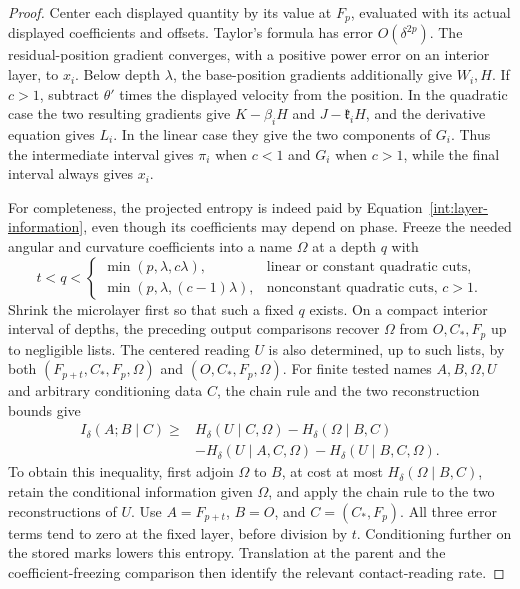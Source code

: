 \begin{proof}
Center each displayed quantity by its value at $F_p$, evaluated
with its actual displayed coefficients and offsets. Taylor's
formula has error $O(\delta^{2p})$. The residual-position
gradient converges, with a positive power error on an interior
layer, to $x_i$. Below depth $\lambda$, the base-position
gradients additionally give $W_i,H$. If $c>1$, subtract
$\theta'$ times the displayed velocity from the position.
In the quadratic case the two resulting gradients give
$K-\beta_iH$ and $J-\mathfrak k_iH$, and the derivative equation
gives $L_i$. In the linear case they give the two components
of $G_i$. Thus the intermediate interval gives $\pi_i$ when
$c<1$ and $G_i$ when $c>1$, while the final interval always
gives $x_i$.

For completeness, the projected entropy is indeed paid by
Equation~\eqref{int:layer-information}, even though its coefficients
may depend on phase. Freeze the needed angular and curvature
coefficients into a name $\Omega$ at a depth $q$ with
\[
 t<q<
 \begin{cases}
 \min(p,\lambda,c\lambda),
    &\text{linear or constant quadratic cuts},\\
 \min(p,\lambda,(c-1)\lambda),
    &\text{nonconstant quadratic cuts, }c>1.
 \end{cases}
\]
Shrink the microlayer first so that such a fixed $q$
exists. On a compact interior interval of depths,
the preceding output comparisons recover $\Omega$ from
$O,C_*,F_p$ up to negligible lists. The centered reading $U$ is
also determined, up to such lists, by both
$(F_{p+t},C_*,F_p,\Omega)$ and $(O,C_*,F_p,\Omega)$.
For finite tested names $A,B,\Omega,U$ and arbitrary
conditioning data $C$, the chain
rule and the two reconstruction bounds give
\[
 \begin{split}
 I_\delta(A;B\mid C)\geq {}&H_\delta(U\mid C,\Omega)
          -H_\delta(\Omega\mid B,C)\\
 &-H_\delta(U\mid A,C,\Omega)
          -H_\delta(U\mid B,C,\Omega).
 \end{split}
\]
To obtain this inequality, first adjoin $\Omega$ to $B$,
at cost at most $H_\delta(\Omega\mid B,C)$, retain the
conditional information given $\Omega$, and apply the
chain rule to the two reconstructions of $U$.
Use $A=F_{p+t}$, $B=O$, and $C=(C_*,F_p)$.
All three error terms tend to zero at the fixed layer,
before division by $t$. Conditioning further on the stored marks lowers this
entropy. Translation at the parent and the coefficient-freezing
comparison then identify the relevant contact-reading rate.


\end{proof}
